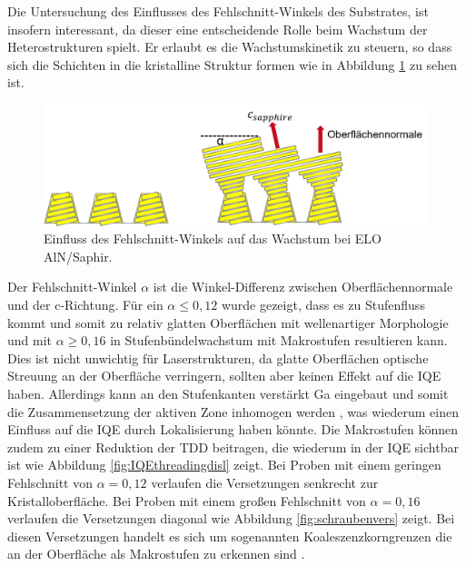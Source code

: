 \noindent
Die Untersuchung des Einflusses des Fehlschnitt-Winkels des Substrates, ist insofern interessant, da dieser eine entscheidende Rolle beim Wachstum der Heterostrukturen spielt. Er erlaubt es die Wachstumskinetik zu steuern, so dass sich die Schichten in die kristalline Struktur formen wie in Abbildung \ref{fig:offcut} zu sehen ist.
\newline
\begin{figure}[H]
\includegraphics[width=\linewidth]{Bilder/offcut.png}
\caption{Einfluss des Fehlschnitt-Winkels auf das Wachstum bei ELO AlN/Saphir.}
\label{fig:offcut}
\end{figure}
\noindent 
Der Fehlschnitt-Winkel $\alpha$ ist die Winkel-Differenz zwischen Oberflächennormale und der c-Richtung. Für ein $\alpha \leq 0,12 $ wurde gezeigt, dass es zu Stufenfluss kommt und somit zu relativ glatten Oberflächen mit wellenartiger Morphologie und mit $\alpha \geq 0,16 $ in Stufenbündelwachstum mit Makrostufen resultieren kann. Dies ist nicht unwichtig für Laserstrukturen, da glatte Oberflächen optische Streuung an der Oberfläche verringern, sollten aber keinen Effekt auf die IQE haben. Allerdings kann an den Stufenkanten verstärkt Ga eingebaut und somit die Zusammensetzung der aktiven Zone inhomogen werden \cite{zeimeru} \cite{MOGILATENKO2014222} \cite{fmehnke}, was wiederum einen Einfluss auf die IQE durch Lokalisierung haben könnte.
\newline
Die Makrostufen können zudem zu einer Reduktion der TDD beitragen, die wiederum in der IQE sichtbar ist wie Abbildung \ref{fig:IQEthreadingdisl} zeigt. Bei Proben mit einem geringen Fehlschnitt von $\alpha = 0,12 $ verlaufen die Versetzungen senkrecht zur Kristalloberfläche. Bei Proben mit einem großen Fehlschnitt von $\alpha = 0,16 $ verlaufen die Versetzungen diagonal wie Abbildung \ref{fig:schraubenvers} zeigt. Bei diesen Versetzungen handelt es sich um sogenannten Koaleszenzkorngrenzen die an der Oberfläche als Makrostufen zu erkennen sind \cite{MOGILATENKO2014222}. 
